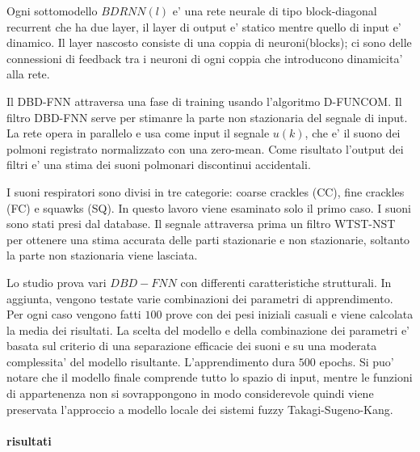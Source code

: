 Ogni sottomodello $BDRNN(l)$ e' una rete neurale di tipo block-diagonal recurrent che ha due layer, il layer di output e' statico mentre quello di input e' dinamico. Il layer nascosto consiste di una coppia di neuroni(blocks); ci sono delle connessioni di feedback tra i neuroni di ogni coppia che introducono dinamicita' alla rete.

Il DBD-FNN attraversa una fase di training usando l'algoritmo D-FUNCOM. Il filtro DBD-FNN serve per stimanre la parte non stazionaria del segnale di input. La rete opera in parallelo e usa come input il segnale $u(k)$, che e' il suono dei polmoni registrato normalizzato con una zero-mean. Come risultato l'output dei filtri e' una stima dei suoni polmonari discontinui accidentali. 

I suoni respiratori sono divisi in tre categorie: coarse crackles (CC), fine crackles (FC) e squawks (SQ). In questo lavoro viene esaminato solo il primo caso. I suoni sono stati presi dal database\cite{LSAITTIOTAF}. Il segnale attraversa prima un filtro WTST-NST per ottenere una stima accurata delle parti stazionarie e non stazionarie, soltanto la parte non stazionaria viene lasciata.


Lo studio prova vari $DBD-FNN$ con differenti caratteristiche strutturali. In aggiunta, vengono testate varie combinazioni dei parametri di apprendimento. Per ogni caso vengono fatti $100$ prove con dei pesi iniziali casuali e viene calcolata la media dei risultati. La scelta del modello e della combinazione dei parametri e' basata sul criterio di una separazione efficacie dei suoni e su una moderata complessita' del modello risultante. L'apprendimento dura $500$ epochs. Si puo' notare che il modello finale comprende tutto lo spazio di input, mentre le funzioni di appartenenza non si sovrappongono in modo considerevole quindi viene preservata l'approccio a modello locale dei sistemi fuzzy Takagi-Sugeno-Kang.

\paragraph{risultati}

